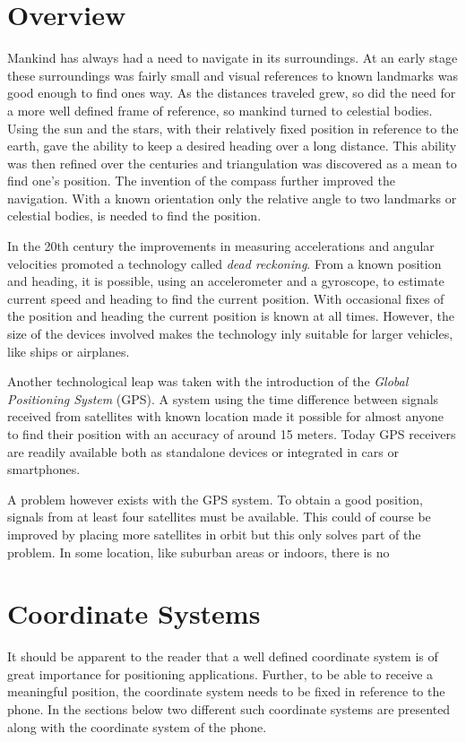 \documentclass{LTHthesis}
\begin{document}
\section{Overview}
%
Mankind has always had a need to navigate in its surroundings. At an early stage these surroundings was fairly small and visual references to known landmarks was good enough to find ones way. As the distances traveled grew, so did the need for a more well defined frame of reference, so mankind turned to celestial bodies. Using the sun and the stars, with their relatively fixed position in reference to the earth, gave the ability to keep a desired heading over a long distance. This ability was then refined over the centuries and triangulation was discovered as a mean to find one's position. The invention of the compass further improved the navigation. With a known orientation only the relative angle to two landmarks or celestial bodies, is needed to find the position. 

In the 20th century the improvements in measuring accelerations and angular velocities promoted a technology called \emph{dead reckoning}. From a known position and heading, it is possible, using an accelerometer and a gyroscope, to estimate current speed and heading to find the current position. With occasional fixes of the position and heading the current position is known at all times. However, the size of the devices involved makes the technology inly suitable for larger vehicles, like ships or airplanes.

Another technological leap was taken with the introduction of the \emph{Global Positioning System} (GPS). A system using the time difference between signals received from satellites with known location made it possible for almost anyone to find their position with an accuracy of around 15 meters. Today GPS receivers are readily available both as standalone devices or integrated in cars or smartphones.

A problem however exists with the GPS system. To obtain a good position, signals from at least  four satellites must be available. This could of course be improved by placing more satellites in orbit but this only solves part of the problem. In some location, like suburban areas or indoors, there is no           
%
\section{Coordinate Systems}
It should be apparent to the reader that a well defined coordinate system is of great importance for positioning applications. Further, to be able to receive a meaningful position, the coordinate system needs to be fixed in reference to the phone. In the sections below two different such coordinate systems are presented along with the coordinate system of the phone. 
\end{document}
